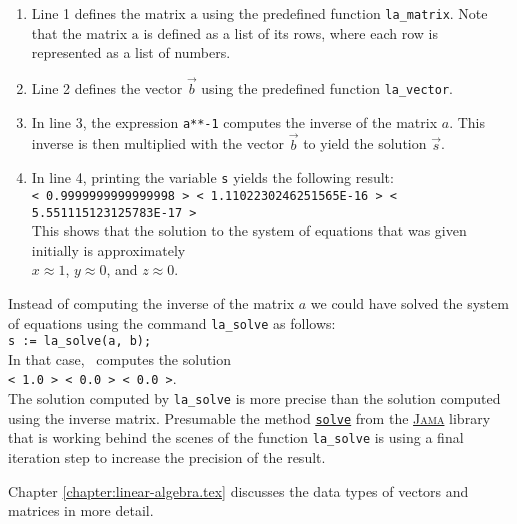 \begin{enumerate}
\item Line 1 defines the matrix $\mathrm{a}$ using the predefined function \texttt{la\_matrix}.
      Note that the matrix $\mathrm{a}$ is defined as a list of its rows, where each row is
      represented as a list of numbers.
\item Line 2 defines the vector $\vec{b}$ using the predefined function \texttt{la\_vector}.
\item In line 3, the expression \texttt{a**-1} computes the inverse of the matrix $a$.
      This inverse is then multiplied with the vector $\vec{b}$ to yield the solution $\vec{s}$.
\item In line 4, printing the variable \texttt{s} yields the following result:
      \\[0.2cm]
      \hspace*{-0.8cm}
      \texttt{< 0.9999999999999998 >  < 1.1102230246251565E-16 >  < 5.551115123125783E-17 >}
      \\[0.2cm]
      This shows that the solution to the system of equations that was given initially is approximately
      \\[0.2cm]
      \hspace*{1.3cm}
      $x \approx 1$, \quad $y \approx 0$, \quad and \quad $z \approx 0$.  
\end{enumerate}
Instead of computing the inverse of the matrix $a$ we could have solved the system of equations
using the command \texttt{la\_solve} as follows:
\\[0.2cm]
\hspace*{1.3cm}
\texttt{s := la\_solve(a, b);}
\\[0.2cm]
In that case, \setlx\ computes the solution
\\[0.2cm]
\hspace*{1.3cm}
\texttt{< 1.0 >  < 0.0 >  < 0.0 >}.
\\[0.2cm]
The solution computed by \texttt{la\_solve} is more precise than the solution computed using the
inverse matrix.  Presumable the method
\href{http://math.nist.gov/javanumerics/jama/doc/Jama/Matrix.html#solve(Jama.Matrix)}{\texttt{solve}}
from the \href{http://math.nist.gov/javanumerics/jama}{\textsc{Jama}} library that is working behind the
scenes of the function \texttt{la\_solve} is using a final iteration step to increase the precision
of the result.
\vspace*{0.2cm}

\noindent
Chapter \ref{chapter:linear-algebra.tex} discusses the data types of vectors and matrices in more
detail. 




